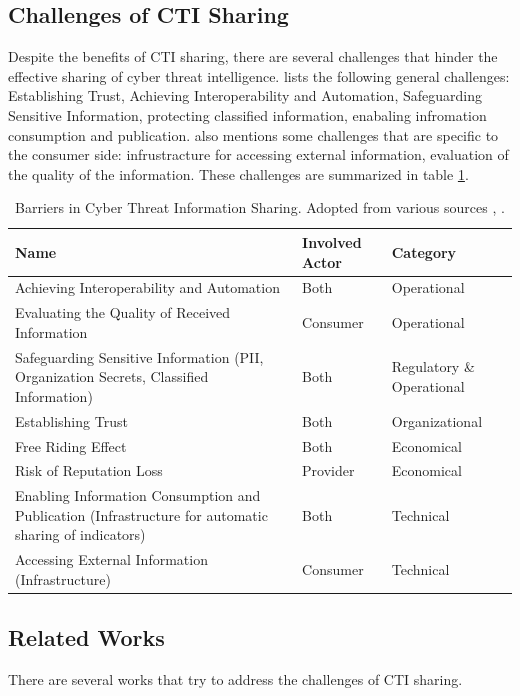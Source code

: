 \subsection{Challenges of CTI Sharing}
Despite the benefits of CTI sharing, there are several challenges that hinder the effective sharing of cyber threat intelligence. \cite{johnson_guide_2016} lists the following general challenges: Establishing Trust, Achieving Interoperability and Automation, Safeguarding Sensitive Information, protecting classified information, enabaling infromation consumption and publication. \cite{johnson_guide_2016} also mentions some challenges that are specific to the consumer side: infrustracture for accessing external information, evaluation of the quality of the information. These challenges are summarized in table \ref{table:barriers}.

\begin{table}[ht]
    \centering
    \begin{tabular}{| m{6cm} | m{3cm} | m{3cm} |}
    \hline
    \textbf{Name} & \textbf{Involved Actor} & \textbf{Category} \\
    \hline
    Achieving Interoperability and Automation & Both & Operational \\
    \hline
    Evaluating the Quality of Received Information & Consumer & Operational \\
    \hline
    Safeguarding Sensitive Information (PII, Organization Secrets, Classified Information) & Both & Regulatory \& Operational \\
    \hline
    Establishing Trust & Both & Organizational \\
    \hline
    Free Riding Effect & Both & Economical \\
    \hline
    Risk of Reputation Loss & Provider & Economical \\
    \hline
    Enabling Information Consumption and Publication (Infrastructure for automatic sharing of indicators) & Both & Technical \\
    \hline
    Accessing External Information (Infrastructure) & Consumer & Technical \\
    \hline
    \end{tabular}
    \caption{Barriers in Cyber Threat Information Sharing. Adopted from various sources \cite{johnson_guide_2016}, \cite{zibak_cyber_2019}.}
    \label{table:barriers}
\end{table}

\subsection{Related Works}
There are several works that try to address the challenges of CTI sharing. 

